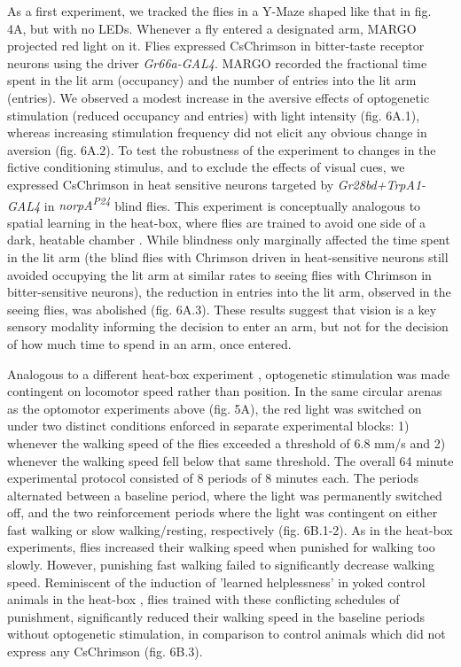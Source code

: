 \documentclass[10pt,letterpaper]{article}
\begin{document}
As a first experiment, we tracked the flies in a Y-Maze shaped like that in fig. 4A, but with no LEDs. Whenever a fly entered a designated arm, MARGO projected red light on it. Flies expressed CsChrimson in bitter-taste receptor neurons using the driver \textit{Gr66a-GAL4}. MARGO recorded the fractional time spent in the lit arm (occupancy) and the number of entries into the lit arm (entries). We observed a modest increase in the aversive effects of optogenetic stimulation (reduced occupancy and entries) with light intensity (fig. 6A.1), whereas increasing stimulation frequency did not elicit any obvious change in aversion (fig. 6A.2). To test the robustness of the experiment to changes in the fictive conditioning stimulus, and to exclude the effects of visual cues, we expressed CsChrimson in heat sensitive neurons targeted by \textit{Gr28bd+TrpA1-GAL4} in \textit{norpA\textsuperscript{P24}} blind flies. This experiment is conceptually analogous to spatial learning in the heat-box, where flies are trained to avoid one side of a dark, heatable chamber \cite{wustmann_rein_wolf_heisenberg_1996,wustmann_heisenberg_1997,diegelmann_2006,ostrowski_kahsai_kramer_knutson_zars_2015,putz_2002,sitaraman_zars_zars_2007,sitaraman_zars_zars_2010,zars_zars_2006}. While blindness only marginally affected the time spent in the lit arm (the blind flies with Chrimson driven in heat-sensitive neurons still avoided occupying the lit arm at similar rates to seeing flies with Chrimson in bitter-sensitive neurons), the reduction in entries into the lit arm, observed in the seeing flies, was abolished (fig. 6A.3). These results suggest that vision is a key sensory modality informing the decision to enter an arm, but not for the decision of how much time to spend in an arm, once entered.

Analogous to a different heat-box experiment \cite{YANG2013799}, optogenetic stimulation was made contingent on locomotor speed rather than position. In the same circular arenas as the optomotor experiments above (fig. 5A), the red light was switched on under two distinct conditions enforced in separate experimental blocks: 1) whenever the walking speed of the flies exceeded a threshold of 6.8 mm/s and 2) whenever the walking speed fell below that same threshold. The overall 64 minute experimental protocol consisted of 8 periods of 8 minutes each. The periods alternated between a baseline period, where the light was permanently switched off, and the two reinforcement periods where the light was contingent on either fast walking or slow walking/resting, respectively (fig. 6B.1-2). As in the heat-box experiments, flies increased their walking speed when punished for walking too slowly. However, punishing fast walking failed to significantly decrease walking speed. Reminiscent of the induction of 'learned helplessness' in yoked control animals in the heat-box \cite{YANG2013799}, flies trained with these conflicting schedules of punishment, significantly reduced their walking speed in the baseline periods without optogenetic stimulation, in comparison to control animals which did not express any CsChrimson (fig. 6B.3).
\end{document}

